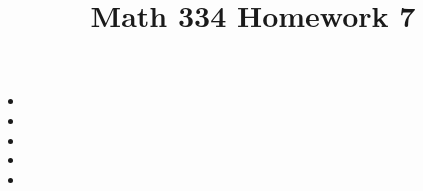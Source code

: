 \documentclass{article}
\title{Math 334 Homework 7}
\begin{document}
\maketitle
\begin{itemize}[label=]
	\item 
	\item 
	\item 
	\item 
	\item 
\end{itemize}
\end{document}
